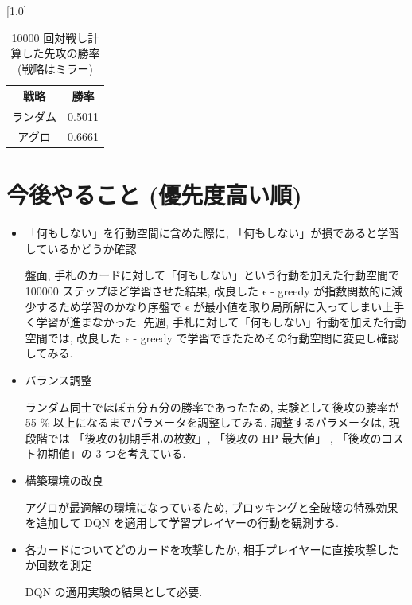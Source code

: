 \documentclass{jarticle}     %
\begin{document}
\begin{table}[t]
  \centering
  \caption{10000 回対戦し計算した先攻の勝率 (戦略はミラー)}
  \vspace{-0.3cm}
  \label{table:result}
  \scalebox{1.0}[1.0]{
    \begin{tabular}{|c|c|}
      \hline
      戦略 & 勝率 \\ \hline
      ランダム & 0.5011 \\ \hline
      アグロ & 0.6661 \\ \hline
  
      \end{tabular}
  }
  \end{table}

\section{今後やること (優先度高い順)}
\begin{itemize}
  \item 「何もしない」を行動空間に含めた際に, 「何もしない」が損であると学習しているかどうか確認
  \par
  盤面, 手札のカードに対して「何もしない」という行動を加えた行動空間で 100000 ステップほど学習させた結果, 改良した $\mathrm{\epsilon}$ - greedy が指数関数的に減少するため学習のかなり序盤で $\mathrm{\epsilon}$ が最小値を取り局所解に入ってしまい上手く学習が進まなかった.
  先週, 手札に対して「何もしない」行動を加えた行動空間では, 改良した $\mathrm{\epsilon}$ - greedy で学習できたためその行動空間に変更し確認してみる.
  \item バランス調整
  \par
  ランダム同士でほぼ五分五分の勝率であったため, 実験として後攻の勝率が 55 \% 以上になるまでパラメータを調整してみる. 調整するパラメータは, 現段階では 「後攻の初期手札の枚数」, 「後攻の HP 最大値」 , 「後攻のコスト初期値」の 3 つを考えている.
  \item 構築環境の改良
  \par
  アグロが最適解の環境になっているため, ブロッキングと全破壊の特殊効果を追加して DQN を適用して学習プレイヤーの行動を観測する.
  \item 各カードについてどのカードを攻撃したか, 相手プレイヤーに直接攻撃したか回数を測定
  \par
  DQN の適用実験の結果として必要.
\end{itemize}




\end{document}
